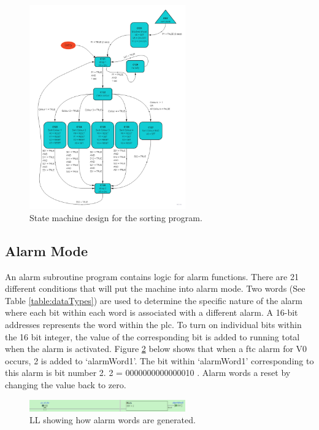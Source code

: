         \begin{figure}[H]
            \centering
            \includegraphics[width = 0.6\textwidth]{2_images/sortStateMachine}
            \caption{State machine design for the sorting program.}
            \label{fig:sortStateMachine}
        \end{figure}
        
    \subsection{Alarm Mode}
        An alarm subroutine program contains logic for alarm functions. There are 21 different conditions that will put the machine into alarm mode. Two words (See Table \ref{table:dataTypes}) are used to determine the specific nature of the alarm where each bit within each word is associated with a different alarm. A 16-bit  addresses represents the word within the \acrshort{plc}. To turn on individual bits within the 16 bit integer, the value of the corresponding bit is added to running total when the alarm is activated. Figure \ref{fig:alarmWord} below shows that when a \acrshort{ftc} alarm for V0 occurs, 2 is added to `alarmWord1'. The bit within `alarmWord1' corresponding to this alarm is bit number 2. 2 = 0000000000000010 .
        Alarm words a reset by changing the value back to zero. 

        \begin{figure}[H]
            \centering
            \includegraphics[width = 0.6\textwidth]{2_images/alarmWord}
            \caption{LL showing how alarm words are generated.}
            \label{fig:alarmWord}
        \end{figure}

